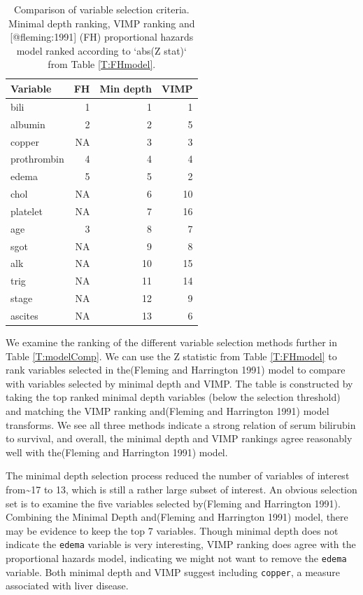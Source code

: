 \documentclass[article]{jss}
\begin{document}
\begin{Schunk}
\begin{table}

\caption{Comparison of variable selection criteria. Minimal depth ranking, VIMP ranking and [@fleming:1991] (FH) proportional hazards model ranked according to `abs(Z stat)` from Table \ref{T:FHmodel}.}
\centering
\begin{tabular}[t]{l|r|r|r}
\hline
Variable & FH & Min depth & VIMP\\
\hline
bili & 1 & 1 & 1\\
\hline
albumin & 2 & 2 & 5\\
\hline
copper & NA & 3 & 3\\
\hline
prothrombin & 4 & 4 & 4\\
\hline
edema & 5 & 5 & 2\\
\hline
chol & NA & 6 & 10\\
\hline
platelet & NA & 7 & 16\\
\hline
age & 3 & 8 & 7\\
\hline
sgot & NA & 9 & 8\\
\hline
alk & NA & 10 & 15\\
\hline
trig & NA & 11 & 14\\
\hline
stage & NA & 12 & 9\\
\hline
ascites & NA & 13 & 6\\
\hline
\end{tabular}
\end{table}

\end{Schunk}

We examine the ranking of the different variable selection methods
further in Table \ref{T:modelComp}. We can use the Z statistic from
Table \ref{T:FHmodel} to rank variables selected in the(Fleming and
Harrington 1991) model to compare with variables selected by minimal
depth and VIMP. The table is constructed by taking the top ranked
minimal depth variables (below the selection threshold) and matching the
VIMP ranking and(Fleming and Harrington 1991) model transforms. We see
all three methods indicate a strong relation of serum bilirubin to
survival, and overall, the minimal depth and VIMP rankings agree
reasonably well with the(Fleming and Harrington 1991) model.

The minimal depth selection process reduced the number of variables of
interest from\textasciitilde{}17 to 13, which is still a rather large
subset of interest. An obvious selection set is to examine the five
variables selected by(Fleming and Harrington 1991). Combining the
Minimal Depth and(Fleming and Harrington 1991) model, there may be
evidence to keep the top 7 variables. Though minimal depth does not
indicate the \texttt{edema} variable is very interesting, VIMP ranking
does agree with the proportional hazards model, indicating we might not
want to remove the \texttt{edema} variable. Both minimal depth and VIMP
suggest including \texttt{copper}, a measure associated with liver
disease.
\end{document}
